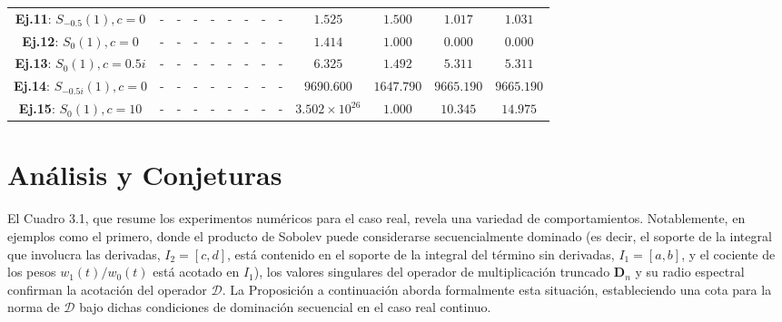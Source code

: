 \begin{table}
\begin{tabular}{|c|cccc|cccc|cccc|}
    \textbf{Ej.11}: $S_{-0.5}(1), c=0$       & -                                             & -                                                & -                                   & -        & -                      & -              & -                       & -        & $1.525$                & $1.500$        & $1.017$                 & $1.031$    \\
    \textbf{Ej.12}: $S_{0}(1), c=0$          & -                                             & -                                                & -                                   & -        & -                      & -              & -                       & -        & $1.414$                & $1.000$        & $0.000$                 & $0.000$    \\
    \textbf{Ej.13}: $S_{0}(1), c=0.5i$       & -                                             & -                                                & -                                   & -        & -                      & -              & -                       & -        & $6.325$                & $1.492$        & $5.311$                 & $5.311$    \\
    \textbf{Ej.14}: $S_{-0.5i}(1), c=0$      & -                                             & -                                                & -                                   & -        & -                      & -              & -                       & -        & $9690.600$             & $1647.790$     & $9665.190$              & $9665.190$ \\
    \textbf{Ej.15}: $S_{0}(1), c=10$         & -                                             & -                                                & -                                   & -        & -                      & -              & -                       & -        & $3.502 \times 10^{26}$ & $1.000$        & $10.345$                & $14.975$   \\
    \hline
  \end{tabular}
\end{table}

\newpage

\section{Análisis y Conjeturas}

El Cuadro 3.1, que resume los experimentos numéricos para el caso real, revela una variedad de comportamientos. Notablemente, en ejemplos como el primero, donde el producto de Sobolev puede considerarse secuencialmente dominado (es decir, el soporte de la integral que involucra las derivadas, $I_2=[c,d]$, está contenido en el soporte de la integral del término sin derivadas, $I_1=[a,b]$, y el cociente de los pesos $w_1(t)/w_0(t)$ está acotado en $I_1$), los valores singulares del operador de multiplicación truncado $\mathbf{D}_n$ y su radio espectral confirman la acotación del operador $\mathcal{D}$. La Proposición a continuación aborda formalmente esta situación, estableciendo una cota para la norma de $\mathcal{D}$ bajo dichas condiciones de dominación secuencial en el caso real continuo.

